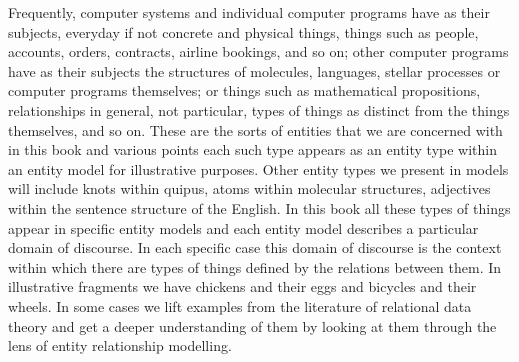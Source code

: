 Frequently, computer systems and individual computer programs have as their subjects, everyday if not concrete and physical things, things such as people, accounts, orders, contracts, airline bookings, and so on; other computer programs have as their subjects the structures of molecules, languages, stellar processes or computer programs themselves; or things such as mathematical propositions, relationships in general, not particular, types of things as distinct from the things themselves, and so on. 
These are the sorts of entities that we are concerned with in this book and various points each such type appears as an entity type within an entity model for illustrative purposes. Other entity types we present in models will include knots within quipus, atoms within molecular structures, adjectives within the sentence structure of the English. 
In this book all these types of things appear in specific entity models and each entity model describes a particular domain of discourse. 
In each specific case this domain of discourse is the context within which there are types of things defined by the relations between them. 
In illustrative fragments we have chickens and their eggs and bicycles and their wheels. 
In some cases we lift examples from the literature of relational data theory and get a deeper understanding of them by looking at them through the lens of entity relationship modelling.



